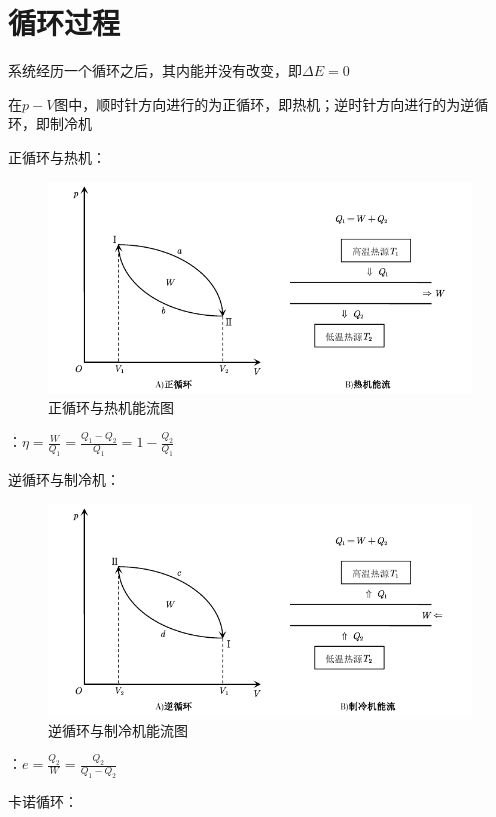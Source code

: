 \documentclass[12pt, a4paper, twoside]{ctexbook}
\begin{document}
\section{循环过程}
系统经历一个循环之后，其内能并没有改变，即$\Delta E=0$

在$p-V$图中，顺时针方向进行的为正循环，即热机；逆时针方向进行的为逆循环，即制冷机

{\sonti 正循环与热机}：
\begin{figure}[H]
    \centerline{\includegraphics[scale=1.2]{正循环与热机能流图.pdf}}
    \caption{正循环与热机能流图}\label{fig:正循环与热机能流图}
\end{figure}
\hspace*{2em}{\sonti 热机效率}：$\eta=\frac{W}{Q_1}=\frac{Q_1-Q_2}{Q_1}=1-\frac{Q_2}{Q_1}$

{\sonti 逆循环与制冷机}：
\begin{figure}[H]
    \centerline{\includegraphics[scale=1.2]{逆循环与制冷机能流图.pdf}}
    \caption{逆循环与制冷机能流图}\label{fig:逆循环与制冷机能流图}
\end{figure}
\hspace*{2em}{\sonti 制冷系数}：$e=\frac{Q_2}{W}=\frac{Q_2}{Q_1-Q_2}$

{\sonti 卡诺循环}：
\end{document}
